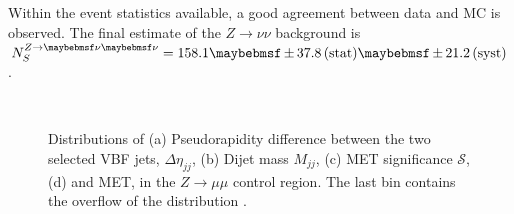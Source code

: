 Within the event statistics available, a good agreement between data and MC is observed. The final estimate of the $Z\rightarrow \nu\nu$ background is $N_{S}^{Z\rightarrow\nu\nu}= 158.1 \pm 37.8 \stat \pm 21.2 \syst$.
% 
\begin{figure}[!htb]
\centering
{}
 \\
\caption{Distributions of (a) Pseudorapidity difference between the two selected \gls{VBF} jets, $\Delta\eta_{jj}$, (b) Dijet mass $M_{jj}$, (c) \gls{MET} significance $\mathcal{S}$, (d) and \gls{MET}, in the $Z\rightarrow \mu\mu$ control region. The last bin contains the overflow of the distribution \cite{ARTICLE:CMSVBFHiggsInvisibleParkedAnalysisPAS}.}
\label{FIGURE:ParkedDataAnalysis_ZBackground_KeyDistributions}
\end{figure}

